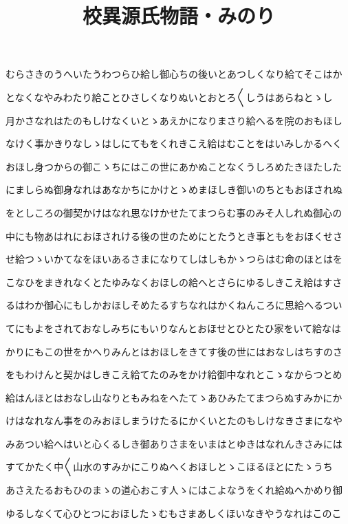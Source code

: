 \documentclass[a4paper,11pt,landscape]{ltjtarticle}
\title{校異源氏物語・みのり}
\date{}
\begin{document}
\maketitle

むらさきのうへいたうわつらひ給し御心ちの後いとあつしくなり給てそこはか
\par\medskip
となくなやみわたり給ことひさしくなりぬいとおとろ〱しうはあらねとゝし
\par\medskip
月かさなれはたのもしけなくいとゝあえかになりまさり給へるを院のおもほし
\par\medskip
なけく事かきりなしゝはしにてもをくれきこえ給はむことをはいみしかるへく
\par\medskip
おほし身つからの御こゝちにはこの世にあかぬことなくうしろめたきほたした
\par\medskip
にましらぬ御身なれはあなかちにかけとゝめまほしき御いのちともおほされぬ
\par\medskip
をとしころの御契かけはなれ思なけかせたてまつらむ事のみそ人しれぬ御心の
\par\medskip
中にも物あはれにおほされける後の世のためにとたうとき事ともをおほくせさ
\par\medskip
せ給つゝいかてなをほいあるさまになりてしはしもかゝつらはむ命のほとはを
\par\medskip
こなひをまきれなくとたゆみなくおほしの給へとさらにゆるしきこえ給はすさ
\par\medskip
るはわか御心にもしかおほしそめたるすちなれはかくねんころに思給へるつい
\par\medskip
てにもよをされておなしみちにもいりなんとおほせとひとたひ家をいて給なは
\par\medskip
かりにもこの世をかへりみんとはおほしをきてす後の世にはおなしはちすのさ
\par\medskip
をもわけんと契かはしきこえ給てたのみをかけ給御中なれとこゝなからつとめ
\par\medskip
給はんほとはおなし山なりともみねをへたてゝあひみたてまつらぬすみかにか
\par\medskip
けはなれなん事をのみおほしまうけたるにかくいとたのもしけなきさまになや
\par\medskip
みあつい給へはいと心くるしき御ありさまをいまはとゆきはなれんきさみには
\par\medskip
すてかたく中〱山水のすみかにこりぬへくおほしとゝこほるほとにたゝうち
\par\medskip
あさえたるおもひのまゝの道心おこす人ゝにはこよなうをくれ給ぬへかめり御
\par\medskip
ゆるしなくて心ひとつにおほしたゝむもさまあしくほいなきやうなれはこのこ
\end{document}

